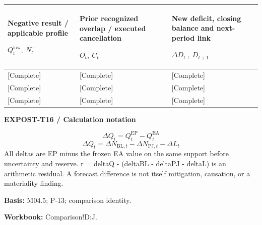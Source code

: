 {\sffamily\fontsize{8.3}{10.3}\selectfont\begin{longtable}{@{}P{54.83mm} P{54.83mm} P{54.83mm}@{}}
\toprule
\textbf{Negative result / applicable profile}\par {\normalfont\fontsize{8.2}{10}\selectfont $Q_t^{\mathrm{low}},\ N_t^-$} & \textbf{Prior recognized overlap / executed cancellation}\par {\normalfont\fontsize{8.2}{10}\selectfont $O_t,\ C_t^-$} & \textbf{New deficit, closing balance and next-period link}\par {\normalfont\fontsize{8.2}{10}\selectfont $\Delta D_t^-,\ D_{t+1}$}\\\midrule\endhead
\rule{0pt}{8mm}[Complete] & [Complete] & [Complete]\\\hline
\rule{0pt}{8mm}[Complete] & [Complete] & [Complete]\\\hline
\rule{0pt}{8mm}[Complete] & [Complete] & [Complete]\\\hline
\end{longtable}}
\par\begingroup\sffamily\fontsize{8}{10}\selectfont\color{NEBGreen}\setlength{\parskip}{2pt}\setlength{\abovedisplayskip}{4pt}\setlength{\belowdisplayskip}{4pt}\setlength{\abovedisplayshortskip}{2pt}\setlength{\belowdisplayshortskip}{3pt}
\textbf{EXPOST-T16 / Calculation notation}\par
{\fontsize{9}{11}\selectfont\[ \Delta Q_t=Q_t^{\mathrm{EP}}-Q_t^{\mathrm{EA}} \]}
{\fontsize{9}{11}\selectfont\[ \Delta Q_t=\Delta N_{\mathrm{BL},t}-\Delta N_{\mathrm{PJ},t}-\Delta L_t \]}
All deltas are EP minus the frozen EA value on the same support before uncertainty and reserve. r = deltaQ - (deltaBL - deltaPJ - deltaL) is an arithmetic residual. A forecast difference is not itself mitigation, causation, or a materiality finding.\par
\textbf{Basis:} M04.5; P-13; comparison identity.\par
\textbf{Workbook:} Comparison!D:J.\par\endgroup
